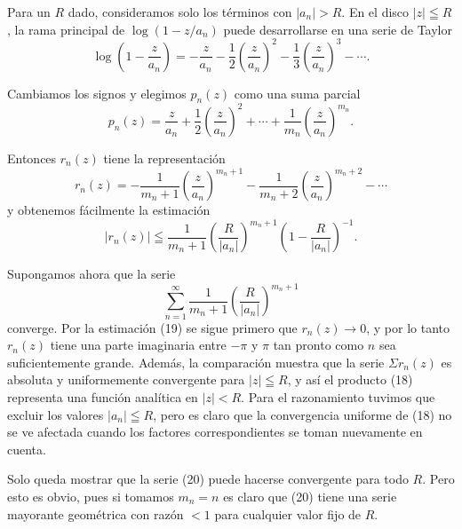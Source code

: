 \documentclass{article}
\theoremstyle{nonumberplain}
\begin{document}
Para un \( R \) dado, consideramos solo los términos con \( \left|a_{n}\right|>R \). En el disco \( |z| \leqq R \), la rama principal de \( \log \left(1-z / a_{n}\right) \) puede desarrollarse en una serie de Taylor
\[
\log \left(1-\frac{z}{a_{n}}\right)=-\frac{z}{a_{n}}-\frac{1}{2}\left(\frac{z}{a_{n}}\right)^{2}-\frac{1}{3}\left(\frac{z}{a_{n}}\right)^{3}-\cdots .
\]

Cambiamos los signos y elegimos \( p_{n}(z) \) como una suma parcial
\[
p_{n}(z)=\frac{z}{a_{n}}+\frac{1}{2}\left(\frac{z}{a_{n}}\right)^{2}+\cdots+\frac{1}{m_{n}}\left(\frac{z}{a_{n}}\right)^{m_{n}} .
\]

Entonces \( r_{n}(z) \) tiene la representación
\[
r_{n}(z)=-\frac{1}{m_{n}+1}\left(\frac{z}{a_{n}}\right)^{m_{n}+1}-\frac{1}{m_{n}+2}\left(\frac{z}{a_{n}}\right)^{m_{n}+2}-\cdots
\]
y obtenemos fácilmente la estimación
\[
\left|r_{n}(z)\right| \leqq \frac{1}{m_{n}+1}\left(\frac{R}{\left|a_{n}\right|}\right)^{m_{n}+1}\left(1-\frac{R}{\left|a_{n}\right|}\right)^{-1} .
\]

Supongamos ahora que la serie
\[
\sum_{n=1}^{\infty} \frac{1}{m_{n}+1}\left(\frac{R}{\left|a_{n}\right|}\right)^{m_{n}+1}
\]
converge. Por la estimación (19) se sigue primero que \( r_{n}(z) \rightarrow 0 \), y por lo tanto \( r_{n}(z) \) tiene una parte imaginaria entre \( -\pi \) y \( \pi \) tan pronto como \( n \) sea suficientemente grande. Además, la comparación muestra que la serie \( \Sigma r_{n}(z) \) es absoluta y uniformemente convergente para \( |z| \leqq R \), y así el producto (18) representa una función analítica en \( |z|<R \). Para el razonamiento tuvimos que excluir los valores \( \left|a_{n}\right| \leqq R \), pero es claro que la convergencia uniforme de (18) no se ve afectada cuando los factores correspondientes se toman nuevamente en cuenta.

Solo queda mostrar que la serie (20) puede hacerse convergente para todo \( R \). Pero esto es obvio, pues si tomamos \( m_{n}=n \) es claro que (20) tiene una serie mayorante geométrica con razón \( <1 \) para cualquier valor fijo de \( R \).
\end{document}
